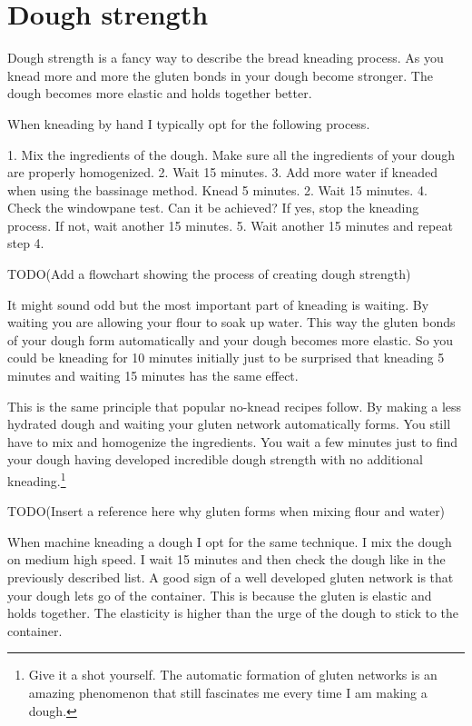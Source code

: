 \section{Dough strength}

Dough strength is a fancy way to describe the bread kneading process. As you
knead more and more the gluten bonds in your dough become stronger. The dough
becomes more elastic and holds together better.

When kneading by hand I typically opt for the following process.

1. Mix the ingredients of the dough. Make sure all the ingredients of your
dough are properly homogenized.
2. Wait 15 minutes.
3. Add more water if kneaded when using the bassinage method. Knead 5 minutes.
2. Wait 15 minutes.
4. Check the windowpane test. Can it be achieved? If yes, stop the kneading
process. If not, wait another 15 minutes.
5. Wait another 15 minutes and repeat step 4.

TODO(Add a flowchart showing the process of creating dough strength)

It might sound odd but the most important part of kneading is waiting. By
waiting you are allowing your flour to soak up water. This way the gluten
bonds of your dough form automatically and your dough becomes more elastic.
So you could be kneading for 10 minutes initially just to be surprised
that kneading 5 minutes and waiting 15 minutes has the same effect.

This is the same principle that popular no-knead recipes follow. By making a less
hydrated dough and waiting your gluten network automatically forms. You still
have to mix and homogenize the ingredients. You wait a few minutes just to
find your dough having developed incredible dough strength with no additional
kneading.\footnote{Give it a shot yourself. The automatic formation of gluten
networks is an amazing phenomenon that still fascinates me every time I am
making a dough.}


TODO(Insert a reference here why gluten forms when mixing flour and water)

When machine kneading a dough I opt for the same technique. I mix the dough on
medium high speed. I wait 15 minutes and then check the dough like in the
previously described list. A good sign of a well developed gluten network is
that your dough lets go of the container. This is because the gluten is
elastic and holds together. The elasticity is higher than the urge of the
dough to stick to the container.


